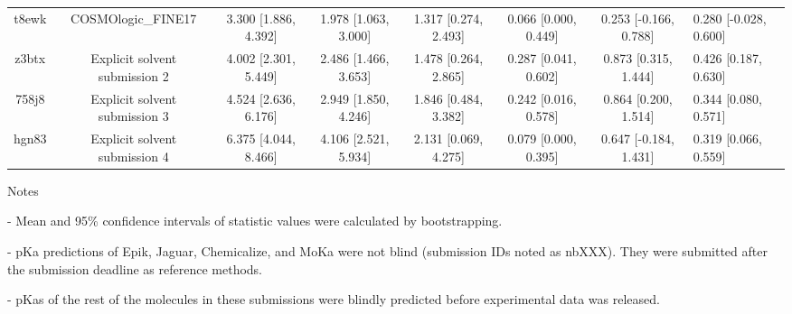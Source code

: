 \documentclass{article}
\begin{document}
\begin{center}
\begin{longtable}{|ccccccc|}
 t8ewk &                                 COSMOlogic\_FINE17 &  3.300 [1.886, 4.392] &  1.978 [1.063, 3.000] &    1.317 [0.274, 2.493] &  0.066 [0.000, 0.449] &  0.253 [-0.166, 0.788] &  0.280 [-0.028, 0.600] \\
 z3btx &                      Explicit solvent submission 2 &  4.002 [2.301, 5.449] &  2.486 [1.466, 3.653] &    1.478 [0.264, 2.865] &  0.287 [0.041, 0.602] &   0.873 [0.315, 1.444] &   0.426 [0.187, 0.630] \\
 758j8 &                      Explicit solvent submission 3 &  4.524 [2.636, 6.176] &  2.949 [1.850, 4.246] &    1.846 [0.484, 3.382] &  0.242 [0.016, 0.578] &   0.864 [0.200, 1.514] &   0.344 [0.080, 0.571] \\
 hgn83 &                      Explicit solvent submission 4 &  6.375 [4.044, 8.466] &  4.106 [2.521, 5.934] &    2.131 [0.069, 4.275] &  0.079 [0.000, 0.395] &  0.647 [-0.184, 1.431] &   0.319 [0.066, 0.559] \\
\end{longtable}
\end{center}

Notes

- Mean and 95\% confidence intervals of statistic values were calculated by bootstrapping.

- pKa predictions of Epik, Jaguar, Chemicalize, and MoKa were not blind (submission IDs noted as nbXXX). They were submitted after the submission deadline as reference methods.

- pKas of the rest of the molecules in these submissions were blindly predicted before experimental data was released.
\end{document}
